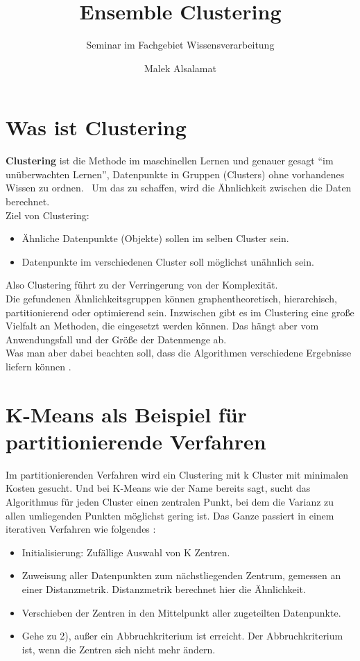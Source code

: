\documentclass[runningheads]{llncs}
\title{Ensemble Clustering}
\subtitle{Seminar im Fachgebiet Wissensverarbeitung}
\author{Malek Alsalamat}
\institute{Universität Kassel}
\begin{document}
\maketitle	


  
\section{Was ist Clustering}
\textbf{Clustering} ist die Methode im maschinellen Lernen und genauer gesagt “im unüberwachten Lernen”, Datenpunkte in Gruppen (Clusters) ohne vorhandenes Wissen zu ordnen.  Um das zu schaffen, wird die Ähnlichkeit zwischen die Daten berechnet.\\[4pt]
Ziel von Clustering: 
\begin{itemize}
	\item Ähnliche Datenpunkte (Objekte) sollen im selben Cluster sein. 
	\item Datenpunkte im verschiedenen Cluster soll möglichst unähnlich sein.   
\end{itemize}
Also Clustering führt zu der Verringerung von der Komplexität.\\[4pt]
Die gefundenen Ähnlichkeitsgruppen können graphentheoretisch, hierarchisch, partitionierend oder optimierend sein. Inzwischen gibt es im Clustering eine große Vielfalt an Methoden, die eingesetzt werden können. Das hängt aber vom Anwendungsfall und der Größe der Datenmenge ab.\\[4pt]
Was man aber dabei beachten soll, dass die Algorithmen verschiedene Ergebnisse liefern können \cite{onlinequelle1}. 

\section{K-Means als Beispiel für partitionierende Verfahren}
Im partitionierenden Verfahren wird ein Clustering mit k Cluster mit minimalen Kosten gesucht. Und bei K-Means wie der Name bereits sagt, sucht das Algorithmus für jeden Cluster einen zentralen Punkt, bei dem die Varianz zu allen umliegenden Punkten möglichst gering ist.
Das Ganze passiert in einem iterativen Verfahren wie folgendes \cite{onlinequelle1}:
\begin{itemize}
	\item Initialisierung: Zufällige Auswahl von K Zentren. 
	\item Zuweisung aller Datenpunkten zum nächstliegenden Zentrum, gemessen an einer Distanzmetrik. Distanzmetrik berechnet hier die Ähnlichkeit. 
	\item Verschieben der Zentren in den Mittelpunkt aller zugeteilten Datenpunkte.
	\item Gehe zu 2), außer ein Abbruchkriterium ist erreicht. Der Abbruchkriterium ist, wenn die Zentren sich nicht mehr ändern.    
\end{itemize}
\end{document}
